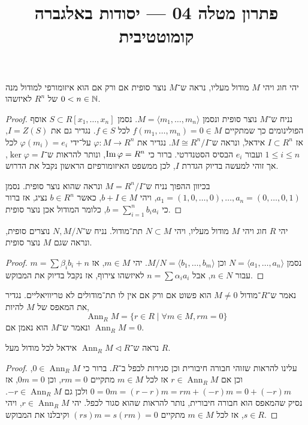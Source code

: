 
\title{פתרון מטלה 04 --- יסודות באלגברה קומוטטיבית}

\DeclareMathOperator{\Ann}{Ann}


\maketitle
\maketitleprint[red]

\question{}
יהי חוג ויהי $M$ מודול מעליו, נראה ש־$M$ נוצר סופית אם ורק אם הוא איזומורפי למודול מנה של $R^n$ לאיזשהו $0 < n \in \mathbb{N}$.
\begin{proof}
	נניח ש־$M$ נוצר סופית ונסמן $M = \langle m_1, \ldots, m_n \rangle$.
	נסמן $S \subset R[x_1, \ldots, x_n]$ אוסף הפולינומים כך שמתקיים $f(m_1, \ldots, m_n) = 0 \in M$ לכל $f \in S$.
	נגדיר גם את $I = Z(S)$, אז $I \subset R^n$ אידאל, ונראה ש־$M \cong R^n / I$.
	נגדיר את $\varphi : M \to R^n$ על־ידי $\varphi(m_i) = e_i$ לכל $1 \le i \le n$ ועבור $e_i$ הבסיס הסטנדרטי.
	ברור כי $\operatorname{Im} \varphi = R^n$, ונותר להראות ש־$\ker \varphi = I$, אך זוהי למעשה בדיוק הגדרת $I$, לכן ממשפט האיזומורפיזם הראשון נקבל את הדרוש.

	בכיוון ההפוך נניח ש־$M = R^n / I$ ונראה שהוא נוצר סופית.
	נסמן $a_1 = (1, 0, \ldots, 0), \ldots, a_n = (0, \ldots, 0, 1)$, ויהי $b + I \in M$, כאשר $b \in R^n$ נציג, אז ברור כי $b = \sum_{i = 1}^n b_i a_i$, כלומר המודול אכן נוצר סופית.
\end{proof}

\question{}
יהי $R$ חוג ויהי $M$ מודול מעליו, ויהי $N \subset M$ תת־מודול.
נניח ש־$N, M / N$ נוצרים סופית, ונראה שגם $M$ נוצר סופית.
\begin{proof}
	נסמן $N = \langle a_1, \ldots, a_n \rangle$ וכן $M / N = \langle b_1, \ldots, b_m \rangle$.
	יהי $m \in M$, אז $m = \sum \beta_i b_i + n$ עבור $n \in N$, אבל $n = \sum \alpha_i a_i$ לאיזשהו צירוף, אז נקבל בדיוק את המבוקש.
\end{proof}

\question{}
נאמר ש־$R$־מודול $M \ne 0$ הוא פשוט אם ורק אם אין לו תת־מודולים לא טריוויאליים.
נגדיר את המאפס של $M$ להיות,
\[
	\Ann_R M
	= \{ r \in R \mid \forall m \in M, r m = 0 \}
\]
ונאמר ש־$M$ הוא נאמן אם $\Ann_R M = 0$.

\subquestion{}
נראה ש־$\Ann_R M \triangleleft R$ אידאל לכל מודול מעל $R$.
\begin{proof}
	עלינו להראות שזוהי חבורה חיבורית וכן סגירות לכפל ב־$R$.
	ברור כי $0 \in \Ann_R M$, וכן אם $r \in \Ann_R M$ אז לכל $m \in M$ מתקיים $r m = 0$, וכן $0 m = 0$, אז $0 = 0 m = (r - r) m = r m + (- r) m = 0 + (-r) m$ ולכן גם $-r \in \Ann_R M$.
	נסיק שהמאפס הוא חבורה חיבורית, נותר להראות שהוא סגור לכפל.
	יהי $r \in \Ann_R M$, ויהי $s \in R$, אז לכל $m \in M$ מתקיים $(r s) m = s (r m) = 0$ וקיבלנו את המבוקש.
\end{proof}

